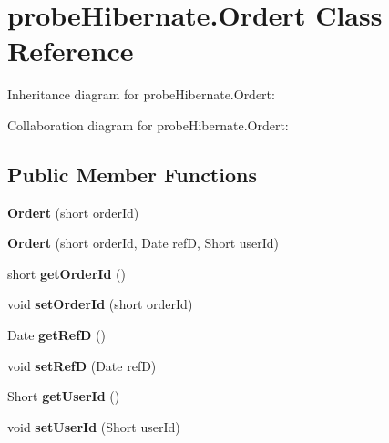 \hypertarget{classprobe_hibernate_1_1_ordert}{}\section{probe\+Hibernate.\+Ordert Class Reference}
\label{classprobe_hibernate_1_1_ordert}


Inheritance diagram for probe\+Hibernate.\+Ordert\+:


Collaboration diagram for probe\+Hibernate.\+Ordert\+:
\subsection*{Public Member Functions}
\begin{DoxyCompactItemize}
\item 
\mbox{\label{classprobe_hibernate_1_1_ordert_ad41990bc95fadcf15e4e8cddef9c8420}} 
{\bfseries Ordert} (short order\+Id)
\item 
\mbox{\label{classprobe_hibernate_1_1_ordert_ae19a7780ab3a8d0bd76d096591dee283}} 
{\bfseries Ordert} (short order\+Id, Date refD, Short user\+Id)
\item 
\mbox{\label{classprobe_hibernate_1_1_ordert_a9428d085a3d1980ec919860938f15af5}} 
short {\bfseries get\+Order\+Id} ()
\item 
\mbox{\label{classprobe_hibernate_1_1_ordert_aaa5db9618c0cef98cd68bbee0fa388db}} 
void {\bfseries set\+Order\+Id} (short order\+Id)
\item 
\mbox{\label{classprobe_hibernate_1_1_ordert_ac4b96f3c77d88f71675fab2f77346d20}} 
Date {\bfseries get\+RefD} ()
\item 
\mbox{\label{classprobe_hibernate_1_1_ordert_a25f0dea7a92a6651d50c363c444b4c78}} 
void {\bfseries set\+RefD} (Date refD)
\item 
\mbox{\label{classprobe_hibernate_1_1_ordert_a8df0927068520b9d76ce2e78ac04c746}} 
Short {\bfseries get\+User\+Id} ()
\item 
\mbox{\label{classprobe_hibernate_1_1_ordert_ad681f0ed1b98b70c74a41d9529b48a7e}} 
void {\bfseries set\+User\+Id} (Short user\+Id)
\end{DoxyCompactItemize}


